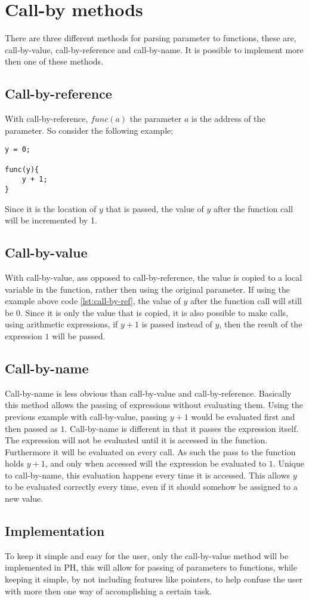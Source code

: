 \section{Call-by methods}
There are three different methods for parsing parameter to functions, these are, call-by-value, call-by-reference and call-by-name. It is possible to implement more then one of these methods.
\subsection*{Call-by-reference}
With call-by-reference, $func(a)$ the parameter $a$ is the address of the parameter. So consider the following example;
\begin{lstlisting}[caption=call-by-reference example, label=lst:call-by-ref]
y = 0;

func(y){
	y + 1;
}
\end{lstlisting}
Since it is the location of $y$ that is passed, the value of $y$ after the function call will be incremented by 1.
\subsection*{Call-by-value}
With call-by-value, ass opposed to call-by-reference, the value is copied to a local variable in the function, rather then using the original parameter. If using the example above code \ref{lst:call-by-ref}, the value of $y$ after the function call will still be $0$. Since it is only the value that  is copied, it is also possible to make calls, using arithmetic expressions, if $y+1$ is passed instead of $y$, then the result of the expression $1$ will be passed.
\subsection*{Call-by-name}
Call-by-name is less obvious than call-by-value and call-by-reference. Basically this method allows the passing of expressions without evaluating them. Using the previous example with call-by-value, passing $y+1$ would be evaluated first and then passed as $1$. Call-by-name is different in that it passes the expression itself. The expression will not be evaluated until it is accessed in the function. Furthermore it will be evaluated on every call. As such the pass to the function holds $y+1$, and only when accessed will the expression be evaluated to $1$. Unique to call-by-name, this evaluation happens every time it is accessed. This allows $y$ to be evaluated correctly every time, even if it should somehow be assigned to a new value.
\subsection*{Implementation}To keep it simple and easy for the user, only the call-by-value method will be implemented in PH, this will allow for passing of parameters to functions, while keeping it simple, by not including features like pointers, to help confuse the user with more then one way of accomplishing a certain task.

